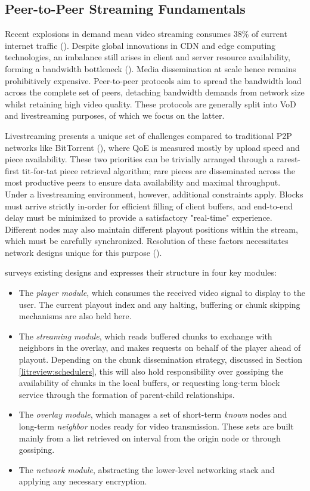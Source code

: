 \documentclass[12pt,a4paper]{article}
\begin{document}
\subsection{Peer-to-Peer Streaming Fundamentals} \label{litreview:fundamentals}
Recent explosions in demand mean video streaming consumes 38\% of current internet traffic (\cite{Sandvine2024}). Despite global innovations in CDN and edge computing technologies, an imbalance still arises in client and server resource availability, forming a bandwidth bottleneck (\cite{Ramzan2012}). Media dissemination at scale hence remains prohibitively expensive. Peer-to-peer protocols aim to spread the bandwidth load across the complete set of peers, detaching bandwidth demands from network size whilst retaining high video quality. These protocols are generally split into VoD and livestreaming purposes, of which we focus on the latter.

Livestreaming presents a unique set of challenges compared to traditional P2P networks like BitTorrent (\cite{Cohen2017}), where QoE is measured mostly by upload speed and piece availability. These two priorities can be trivially arranged through a rarest-first tit-for-tat piece retrieval algorithm; rare pieces are disseminated across the most productive peers to ensure data availability and maximal throughput. Under a livestreaming environment, however, additional constraints apply. Blocks must arrive strictly in-order for efficient filling of client buffers, and end-to-end delay must be minimized to provide a satisfactory "real-time" experience. Different nodes may also maintain different playout positions within the stream, which must be carefully synchronized. Resolution of these factors necessitates network designs unique for this purpose (\cite{Liu2008}).

\cite{Friedman2015} surveys existing designs and expresses their structure in four key modules:

\begin{itemize}
	\item The \textit{player module}, which consumes the received video signal to display to the user. The current playout index and any halting, buffering or chunk skipping mechanisms are also held here.
	\item The \textit{streaming module}, which reads buffered chunks to exchange with neighbors in the overlay, and makes requests on behalf of the player ahead of playout. Depending on the chunk dissemination strategy, discussed in Section \ref{litreview:schedulers}, this will also hold responsibility over gossiping the availability of chunks in the local buffers, or requesting long-term block service through the formation of parent-child relationships.
	\item The \textit{overlay module}, which manages a set of short-term \textit{known} nodes and long-term \textit{neighbor} nodes ready for video transmission. These sets are built mainly from a list retrieved on interval from the origin node or through gossiping.
	\item The \textit{network module}, abstracting the lower-level networking stack and applying any necessary encryption.
\end{itemize}
\end{document}
